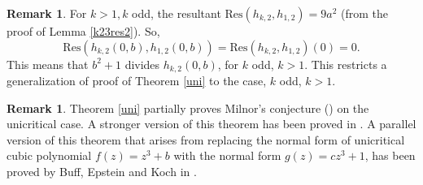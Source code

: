 \documentclass[reqno]{amsart}
\numberwithin{equation}{section}
\theoremstyle{plain}
\theoremstyle{definition}
\newtheorem{remark}[theorem]{Remark}
\theoremstyle{definition}
\begin{document}
    \begin{remark}
        For $k>1, k$ odd, the resultant $\mbox{Res}(h_{k,2}, h_{1,2})=9a^{2}$ (from the proof of Lemma \ref{k23res2}). So, $$\mbox{Res}(h_{k,2}(0,b), h_{1,2}(0,b))= \mbox{Res}(h_{k,2}, h_{1,2}) (0) =0.$$ This means that $b^{2}+1$ divides $h_{k,2}(0,b)$, for $k$ odd, $k>1$. This restricts a generalization of proof of Theorem \ref{uni} to the case, $k$ odd, $k>1$. 
    \end{remark}
    \begin{remark}
        Theorem \ref{uni} partially proves Milnor's conjecture (\cite{Milnor+2014+15+24}) on the unicritical case. A stronger version of this theorem has been proved in \cite{Gok20}. A parallel version of this theorem that arises from replacing the normal form of unicritical cubic polynomial $f(z)= z^{3}+b$ with the normal form $g(z)= cz^{3}+1$, has been proved by Buff, Epstein and Koch in \cite{article1}.
    \end{remark}
\end{document}
